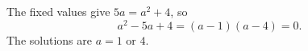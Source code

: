 The fixed values give $5a=a^2+4$, so
\[
a^2-5a+4=(a-1)(a-4)=0.
\]
The solutions are $\boxed{a=1\text{ or }4}$.
